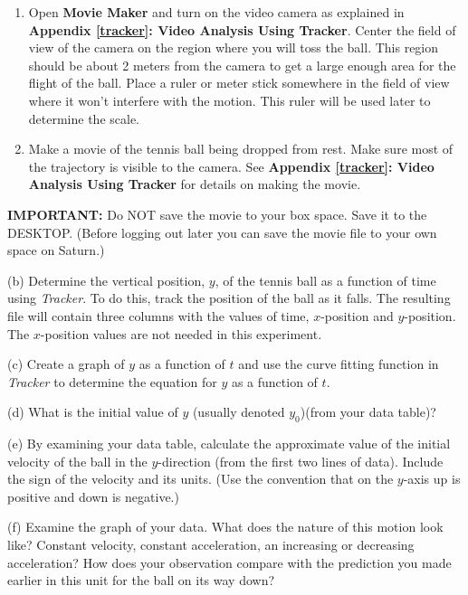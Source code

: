 \begin{enumerate}
\item Open \textbf{Movie Maker} and turn on the video camera as explained in \textbf{Appendix \ref{tracker}: Video Analysis Using Tracker}. Center the field of view of the camera on the region where you will toss the ball. This region should be about 2 meters from the camera to get a large enough area for the flight of the ball. Place a ruler or meter stick somewhere in the field of view where it won't interfere with the motion. This ruler will be used later to determine the scale. 
\item Make a movie of the tennis ball being dropped from rest. Make sure most of the trajectory is visible to the camera. See \textbf{Appendix \ref{tracker}: Video Analysis Using Tracker} for 
details on making the movie.
\end{enumerate}
\textbf{IMPORTANT:} Do NOT save the movie to your box space.  Save it to the DESKTOP.  (Before logging out later you can save the movie file to your own space on Saturn.)
\vspace{5mm}

(b) Determine the vertical position, $y$, of the tennis ball as a function of time using \textit{Tracker}. 
To do this, track the position of the ball as it falls. The resulting file will contain three columns with the values of time, $x$-position and $y$-position. The $x$-position values are not needed in this experiment.
\vspace{5mm}

(c) Create a graph of $y$ as a function of $t$ and use the curve fitting function in \textit{Tracker} to determine the equation for $y$ as a function of $t$.
\vspace{5mm}

(d) What is the initial value of $y$ (usually denoted \( y_{0} \))(from your data table)? 
\vspace{10mm}

\newpage
(e) By examining your data table, calculate the approximate value of the initial velocity of the ball in the $y$-direction (from the first two lines of data). Include the sign of the velocity and its units. (Use the convention that on the $y$-axis up is positive and down is negative.)
\vspace{20mm}

(f) Examine the graph of your data. What does the nature of this motion look
like? Constant velocity, constant acceleration, an increasing or decreasing
acceleration? How does your observation compare with the prediction you made
earlier in this unit for the ball on its way down?
\vspace{20mm}

